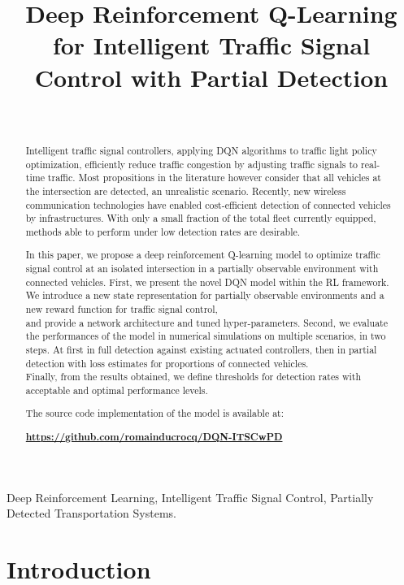 \documentclass[journal]{IEEEtran}
\title{Deep Reinforcement Q-Learning for Intelligent Traffic Signal Control with Partial Detection}
\author{
\IEEEauthorblockN{Romain Ducrocq, Nadir Farhi} \\
\IEEEauthorblockA{COSYS-GRETTIA, Univ Gustave Eiffel, IFSTTAR, F-77454 Marne-la-Vallée, France}
}
\begin{document}
\maketitle
\begin{abstract}
Intelligent traffic signal controllers, applying DQN algorithms to traffic light policy optimization, efficiently reduce traffic congestion by adjusting traffic signals to real-time traffic.
Most propositions in the literature however consider that all vehicles at the intersection are detected, an unrealistic scenario. 
Recently, new wireless communication technologies have enabled cost-efficient detection of connected vehicles by infrastructures.
With only a small fraction of the total fleet currently equipped, methods able to perform under low detection rates are desirable.

In this paper, we propose a deep reinforcement Q-learning model to optimize traffic signal control at an isolated intersection in a partially observable environment with connected vehicles. 
First, we present the novel DQN model within the RL framework. We introduce a new state representation for partially observable environments and a new reward function for traffic signal control, \\ and provide a network architecture and tuned hyper-parameters.
Second, we evaluate the performances of the model in numerical simulations on multiple scenarios, in two steps. At first in full detection against existing actuated controllers, then in partial detection with loss estimates for proportions of connected vehicles. \\
Finally, from the results obtained, we define thresholds for detection rates with acceptable and optimal performance levels. 

The source code implementation of the model is available at:

\textcolor{blue}{\textbf{\url{https://github.com/romainducrocq/DQN-ITSCwPD}}}
\end{abstract}

\begin{IEEEkeywords}
Deep Reinforcement Learning, Intelligent Traffic Signal Control, Partially Detected Transportation Systems.
\end{IEEEkeywords}

\section{Introduction}
\label{sec:intro}
\end{document}
